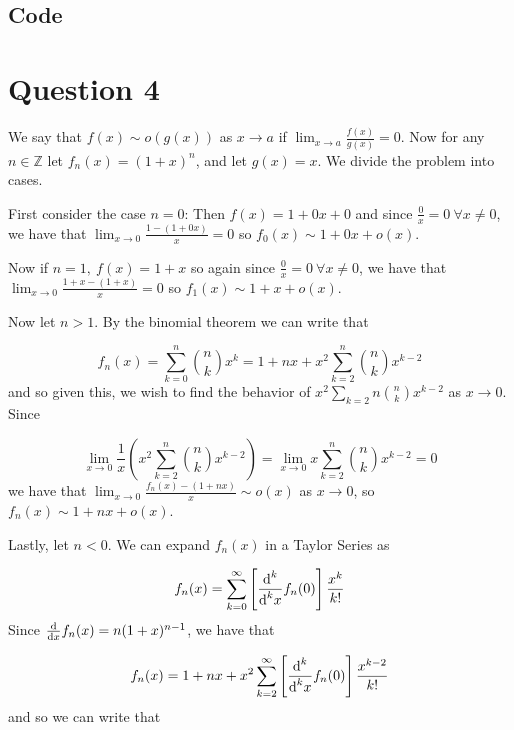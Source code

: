 \documentclass[12pt]{exam}
\newcommand{\diffd}{\textnormal{d}}
\begin{document}
\subsection*{Code}
%

\newpage

\section*{Question 4}

We say that $f(x)\sim o(g(x))$ as $x\rightarrow a$ if $\lim_{x\rightarrow a} \frac{f(x)}{g(x)}=0$. Now for any $n\in \mathbb{Z}$ let $f_n(x)=(1+x)^n$, and let $g(x)=x$. We divide the problem into cases.

 First consider the case $n=0$: Then $f(x) = 1+0x+0$ and since $\frac{0}{x}=0\ \forall x \ne 0$, we have that $\lim_{x\rightarrow 0} \frac{1-(1+0x)}{x}=0$ so $f_0(x)\sim 1+0x+o(x)$.

Now if $n=1,\ f(x)=1+x$ so again since $\frac{0}{x}=0\ \forall x \ne 0$, we have that $\lim_{x\rightarrow 0} \frac{1+x-(1+x)}{x}=0$ so $f_1(x)\sim 1+x+o(x)$.

Now let $n>1$. By the binomial theorem we can write that 

\begin{equation}
f_n(x) = \sum_{k=0}^n {n\choose k} x^k = 1+nx+x^2 \sum_{k=2}^n {n\choose k} x^{k-2} 
\end{equation}
and so given this, we wish to find the behavior of $x^2\sum_{k=2}{n}{n\choose k}x^{k-2}$ as $x\rightarrow 0$. Since

\begin{equation}
\lim_{x\rightarrow 0}\frac{1}{x} \left(x^2\sum_{k=2}^{n}{n\choose k}x^{k-2}\right) =  \lim_{x\rightarrow 0} x\sum_{k=2}^{n}{n\choose k}x^{k-2} =0 
\end{equation}
we have that $\lim_{x\rightarrow 0} \frac{f_n(x)-(1+nx)}{x}\sim o(x)$ as $x\rightarrow 0$, so $f_n(x) \sim 1+nx+o(x)$.

Lastly, let $n<0$. We can expand $f_n(x)$ in a Taylor Series as

\begin{equation}
f_n(x) = \sum_{k=0}^{\infty} \left[\frac{\diffd^k}{\diffd^k x}f_n(0)\right] \frac{x^k}{k!}
\end{equation}
Since $\frac{\diffd}{\diffd x} f_n(x) = n(1+x)^{n-1}$, we have that 

\begin{equation}
f_n(x) = 1+nx+x^2\sum_{k=2}^{\infty} \left[\frac{\diffd^k}{\diffd^k x}f_n(0)\right] \frac{x^{k-2}}{k!}
\end{equation}
and so we can write that 
\end{document}
